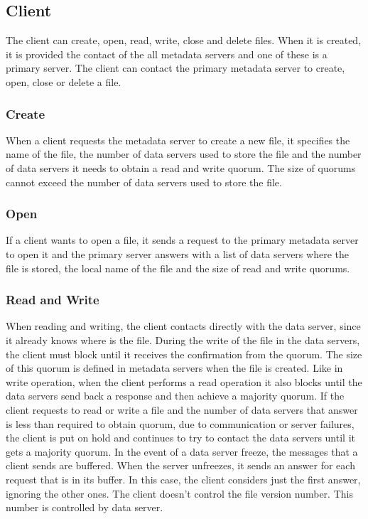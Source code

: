 \subsection{Client}

The client can create, open, read, write, close and delete files. When
it is created, it is provided the contact of the all metadata servers
and one of these is a primary server. 
The client can contact the primary metadata server to create, open,
close or delete a file.

\subsubsection{Create} 

When a client requests the metadata server to create a new file, it
specifies the name of the file, the number of data servers used to
store the file and the number of data servers it needs to obtain a read
and write quorum. The size of quorums cannot exceed the number of data
servers used to store the file.

\subsubsection{Open}

If a client wants to open a file, it sends a request to the primary
metadata server to open it and the primary server answers with a list
of data servers where the file is stored, the local name of the file and 
the size of read and write quorums.

\subsubsection{Read and Write}

When reading and writing, the client contacts directly with the data server,
since it already knows where is the file. During the write of
the file in the data servers, the client must block until it receives the
confirmation from the quorum. The size of this quorum is defined in
metadata servers when the file is created. Like in write operation, when the
client performs a read operation it also blocks until the data servers send 
back a response and then achieve a majority quorum.
If the client requests to read or write a file and the number of data
servers that answer is less than required to obtain quorum, due to
communication or server failures, the client is put on
hold and continues to try to contact the data servers until it gets a
majority quorum.
In the event of a data server freeze, the messages that a client sends are
buffered. When the server unfreezes, it sends an answer for each request
that is in its buffer. In this case, the client considers just the first
answer, ignoring the other ones.
The client doesn't control the file version number. This number is
controlled by data server.

